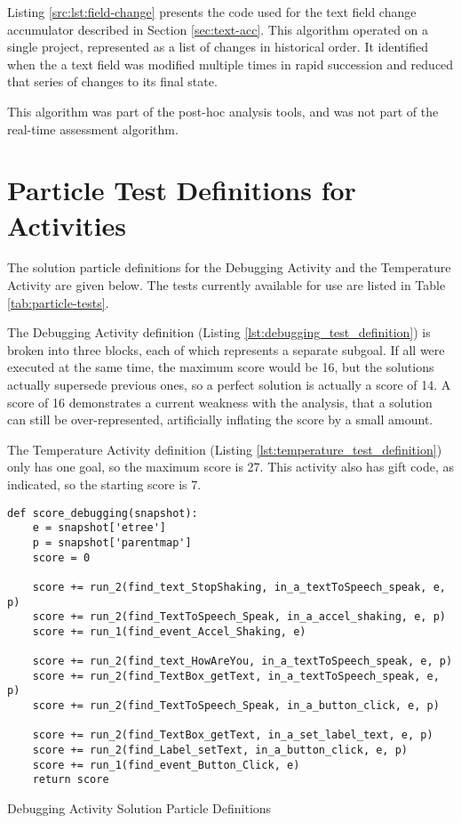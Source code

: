 Listing \ref{src:lst:field-change} presents the code used for the text field change accumulator described in Section \ref{sec:text-acc}. This algorithm operated on a single project, represented as a list of changes in historical order. It identified when the a text field was modified multiple times in rapid succession and reduced that series of changes to its final state.

This algorithm was part of the post-hoc analysis tools, and was not part of the real-time assessment algorithm.

\section{Particle Test Definitions for Activities}
\label{app:particle_definitions}
The solution particle definitions for the Debugging Activity and the Temperature Activity are given below. The tests currently available for use are listed in Table \ref{tab:particle-tests}. 

The Debugging Activity definition (Listing \ref{lst:debugging_test_definition}) is broken into three blocks, each of which represents a separate subgoal. If all were executed at the same time, the maximum score would be 16, but the solutions actually supersede previous ones, so a perfect solution is actually a score of 14. A score of 16 demonstrates a current weakness with the analysis, that a solution can still be over-represented, artificially inflating the score by a small amount.

The Temperature Activity definition (Listing \ref{lst:temperature_test_definition}) only has one goal, so the maximum score is 27. This activity also has gift code, as indicated, so the starting score is 7. 

\begin{listing}[]
\begin{verbatim}
def score_debugging(snapshot):
    e = snapshot['etree']
    p = snapshot['parentmap']
    score = 0

    score += run_2(find_text_StopShaking, in_a_textToSpeech_speak, e, p)
    score += run_2(find_TextToSpeech_Speak, in_a_accel_shaking, e, p)
    score += run_1(find_event_Accel_Shaking, e)

    score += run_2(find_text_HowAreYou, in_a_textToSpeech_speak, e, p)
    score += run_2(find_TextBox_getText, in_a_textToSpeech_speak, e, p)
    score += run_2(find_TextToSpeech_Speak, in_a_button_click, e, p)

    score += run_2(find_TextBox_getText, in_a_set_label_text, e, p)
    score += run_2(find_Label_setText, in_a_button_click, e, p)
    score += run_1(find_event_Button_Click, e)
    return score
\end{verbatim}
\caption{Debugging Activity Solution Particle Definitions}
\label{lst:debugging_test_definition}
\end{listing}

